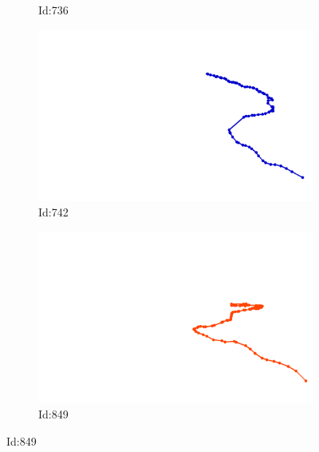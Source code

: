 \documentclass[12pt,twoside]{report}
\begin{document}
\begin{figure}
\begin{subfigure}[b]{0.20\textwidth}
\caption{Id:736}
\end{subfigure}
\begin{subfigure}[b]{0.20\textwidth}
\centering
\includegraphics[width=\textwidth]{../../trajectories/742.png}
\caption{Id:742}
\end{subfigure}
\begin{subfigure}[b]{0.20\textwidth}
\centering
\includegraphics[width=\textwidth]{../../trajectories/849.png}
\caption{Id:849}
\end{subfigure}
\end{figure}
\end{document}
